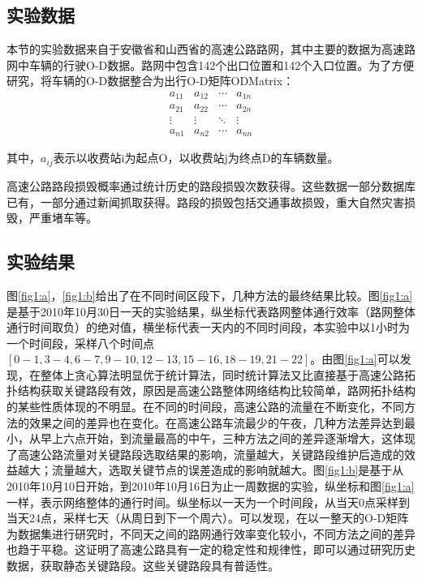 			\subsection{实验数据}
				本节的实验数据来自于安徽省和山西省的高速公路路网，其中主要的数据为高速路网中车辆的行驶O-D数据。路网中包含142个出口位置和142个入口位置。为了方便研究，将车辆的O-D数据整合为出行O-D矩阵ODMatrix：
				\[\begin{array}{*{20}{c}}
				{{a_{11}}}&{{a_{12}}}& \cdots &{{a_{1n}}}\\
				{{a_{21}}}&{{a_{22}}}& \cdots &{{a_{2n}}}\\
				 \vdots & \vdots & \ddots & \vdots \\
				{{a_{n1}}}&{{a_{n2}}}& \cdots &{{a_{nn}}}
				\end{array}\]

				其中，$a_{ij}$表示以收费站i为起点O，以收费站j为终点D的车辆数量。

				高速公路路段损毁概率通过统计历史的路段损毁次数获得。这些数据一部分数据库已有，一部分通过新闻抓取获得。路段的损毁包括交通事故损毁，重大自然灾害损毁，严重堵车等。

			\subsection{实验结果}
				图\ref{fig1:a}，\ref{fig1:b}给出了在不同时间区段下，几种方法的最终结果比较。图\ref{fig1:a}是基于2010年10月30日一天的实验结果，纵坐标代表路网整体通行效率（路网整体通行时间取负）的绝对值，横坐标代表一天内的不同时间段，本实验中以1小时为一个时间段，采样八个时间点$[0-1,3-4,6-7,9-10,12-13,15-16,18-19,21-22]$。由图\ref{fig1:a}可以发现，在整体上贪心算法明显优于统计算法，同时统计算法又比直接基于高速公路拓扑结构获取关键路段有效，原因是高速公路整体网络结构比较简单，路网拓扑结构的某些性质体现的不明显。在不同的时间段，高速公路的流量在不断变化，不同方法的效果之间的差异也在变化。在高速公路车流最少的午夜，几种方法差异达到最小，从早上六点开始，到流量最高的中午，三种方法之间的差异逐渐增大，这体现了高速公路流量对关键路段选取结果的影响，流量越大，关键路段维护后造成的效益越大；流量越大，选取关键节点的误差造成的影响就越大。图\ref{fig1:b}是基于从2010年10月10日开始，到2010年10月16日为止一周数据的实验，纵坐标和图\ref{fig1:a}一样，表示网络整体的通行时间。纵坐标以一天为一个时间段，从当天0点采样到当天24点，采样七天（从周日到下一个周六）。可以发现，在以一整天的O-D矩阵为数据集进行研究时，不同天之间的路网通行效率变化较小，不同方法之间的差异也趋于平稳。这证明了高速公路具有一定的稳定性和规律性，即可以通过研究历史数据，获取静态关键路段。这些关键路段具有普适性。



